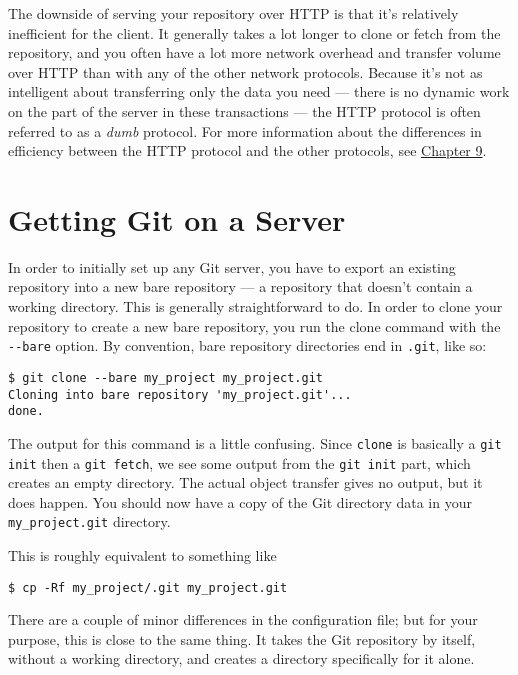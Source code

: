 \documentclass[a4paper]{book}
\newcommand{\prechap}{Chapter }
\newcommand{\postchap}{}
\newcommand{\chapref}[1]{\hyperref[chap:#1]{\prechap #1\postchap}}
\begin{document}
The downside of serving your repository over HTTP is that it's relatively inefficient for the client. It generally takes a lot longer to clone or fetch from the repository, and you often have a lot more network overhead and transfer volume over HTTP than with any of the other network protocols. Because it's not as intelligent about transferring only the data you need --- there is no dynamic work on the part of the server in these transactions --- the HTTP protocol is often referred to as a \emph{dumb} protocol. For more information about the differences in efficiency between the HTTP protocol and the other protocols, see \chapref{9}.

\section{Getting Git on a Server}\label{getting-git-on-a-server}

In order to initially set up any Git server, you have to export an existing repository into a new bare repository --- a repository that doesn't contain a working directory. This is generally straightforward to do. In order to clone your repository to create a new bare repository, you run the clone command with the \texttt{-{}-bare} option. By convention, bare repository directories end in \texttt{.git}, like so:

\begin{shaded}\begin{verbatim}
$ git clone --bare my_project my_project.git
Cloning into bare repository 'my_project.git'...
done.
\end{verbatim}\end{shaded}

The output for this command is a little confusing. Since \texttt{clone} is basically a \texttt{git init} then a \texttt{git fetch}, we see some output from the \texttt{git init} part, which creates an empty directory. The actual object transfer gives no output, but it does happen. You should now have a copy of the Git directory data in your \texttt{my\_project.git} directory.

This is roughly equivalent to something like

\begin{shaded}\begin{verbatim}
$ cp -Rf my_project/.git my_project.git
\end{verbatim}\end{shaded}

There are a couple of minor differences in the configuration file; but for your purpose, this is close to the same thing. It takes the Git repository by itself, without a working directory, and creates a directory specifically for it alone.
\end{document}

